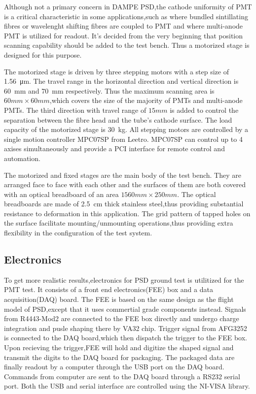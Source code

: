 \documentclass[preprint,5p,times]{elsarticle}
\begin{document}
Although not a primary concern in DAMPE PSD,the cathode uniformity of PMT is a critical characteristic in some applications,such as where bundled sintillating fibres or wavelenght shifting fibres are coupled to PMT and where multi-anode PMT is utilized for readout.
It's decided from the very beginning that position scanning capability should be added to the test bench.
Thus a motorized stage is designed for this purpose.

The motorized stage is driven by three stepping motors with a step size of \SI{1.56}{\micro\meter}.
The travel range in the horizontal direction and vertical direction is \SI{60}{\milli\meter} and \SI{70}{\milli\meter} respectively.
Thus the maximum scanning area is $60mm\times60mm$,which covers the size of the majority of PMTs and multi-anode PMTs.
The third direction with travel range of $15mm$ is added to control the separation between the fibre head and the tube's cathode surface.
The load capacity of the motorized stage is \SI{30}{\kilo\gram}.
All stepping motors are controlled by a single motion controller MPC07SP from Leetro.
MPC07SP can control up to 4 axises simultaneously and provide a PCI interface for remote control and automation.

The motorized and fixed stages are the main body of the test bench.
They are arranged face to face with each other and the surfaces of them are both covered with an optical breadboard of an area $1560mm\times250mm$.
The optical breadboards are made of \SI{2.5}{cm} thick stainless steel,thus providing substantial resistance to deformation in this application.
The grid pattern of tapped holes on the surface facilitate mounting/unmounting operations,thus providing extra flexibility in the configuration of the test system.

\subsection{Electronics}
\label{sec:electronics}

To get more realistic results,electronics for PSD ground test is utilitized for the PMT test.
It consists of a front end electronics(FEE) box and a data acquisition(DAQ) board.
The FEE is based on the same design as the flight model of PSD,except that it uses commertial grade components instead.
Signals from R4443-Mod2 are connected to the FEE box directly and undergo charge integration and pusle shaping there by VA32 chip.
Trigger signal from AFG3252 is connected to the DAQ board,which then dispatch the trigger to the FEE box.
Upon recieving the trigger,FEE will hold and digitize the shaped signal and transmit the digits to the DAQ board for packaging.
The packaged data are finally readout by a computer through the USB port on the DAQ board.
Commands from computer are sent to the DAQ board through a RS232 serial port.
Both the USB and serial interface are controlled using the NI-VISA library.
\end{document}
